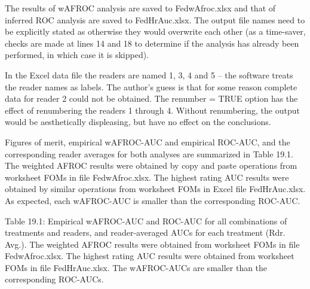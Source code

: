 \documentclass[
]{book}
\begin{document}
The results of wAFROC analysis are saved to FedwAfroc.xlsx and that of inferred ROC analysis are saved to FedHrAuc.xlsx. The output file names need to be explicitly stated as otherwise they would overwrite each other (as a time-saver, checks are made at lines 14 and 18 to determine if the analysis has already been performed, in which case it is skipped).

In the Excel data file the readers are named 1, 3, 4 and 5 -- the software treats the reader names as labels. The author's guess is that for some reason complete data for reader 2 could not be obtained. The renumber = TRUE option has the effect of renumbering the readers 1 through 4. Without renumbering, the output would be aesthetically displeasing, but have no effect on the conclusions.

Figures of merit, empirical wAFROC-AUC and empirical ROC-AUC, and the corresponding reader averages for both analyses are summarized in Table 19.1. The weighted AFROC results were obtained by copy and paste operations from worksheet FOMs in file FedwAfroc.xlsx. The highest rating AUC results were obtained by similar operations from worksheet FOMs in Excel file FedHrAuc.xlsx. As expected, each wAFROC-AUC is smaller than the corresponding ROC-AUC.

Table 19.1: Empirical wAFROC-AUC and ROC-AUC for all combinations of treatments and readers, and reader-averaged AUCs for each treatment (Rdr. Avg.). The weighted AFROC results were obtained from worksheet FOMs in file FedwAfroc.xlsx. The highest rating AUC results were obtained from worksheet FOMs in file FedHrAuc.xlsx. The wAFROC-AUCs are smaller than the corresponding ROC-AUCs.
\end{document}
